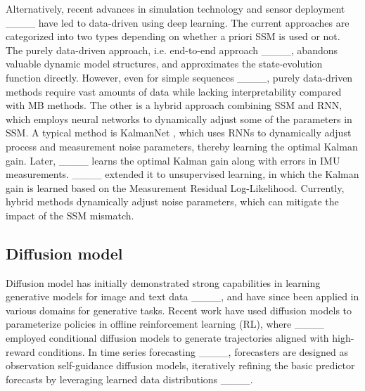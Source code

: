 Alternatively, recent advances in simulation technology and sensor deployment ____ have led to data-driven using deep learning. 
The current approaches are categorized into two types depending on whether a priori SSM is used or not.
The purely data-driven approach, i.e. end-to-end approach ____, abandons valuable dynamic model structures, and approximates the state-evolution function directly. 
However, even for simple sequences ____, purely data-driven methods require vast amounts of data while lacking interpretability compared with MB methods.
The other is a hybrid approach combining SSM and RNN, which employs neural networks to dynamically adjust some of the parameters in SSM. 
A typical method is KalmanNet \cite {9733186}, which uses RNNs to dynamically adjust process and measurement noise parameters, thereby learning the optimal Kalman gain. 
Later, ____ learns the optimal Kalman gain along with errors in IMU measurements. ____ extended it to unsupervised learning, in which the Kalman gain is learned based on the Measurement Residual Log-Likelihood. 
Currently, hybrid methods dynamically adjust noise parameters, which can mitigate the impact of the SSM mismatch.

\subsection{Diffusion model}

Diffusion model has initially demonstrated strong capabilities in learning generative models for image and text data ____, and have since been applied in various domains for generative tasks. 
Recent work have used diffusion models to parameterize policies in offline reinforcement learning (RL), where ____ employed conditional diffusion models to generate trajectories aligned with high-reward conditions. 
In time series forecasting ____, forecasters are designed as observation self-guidance diffusion models, iteratively refining the basic predictor forecasts by leveraging learned data distributions ____.



